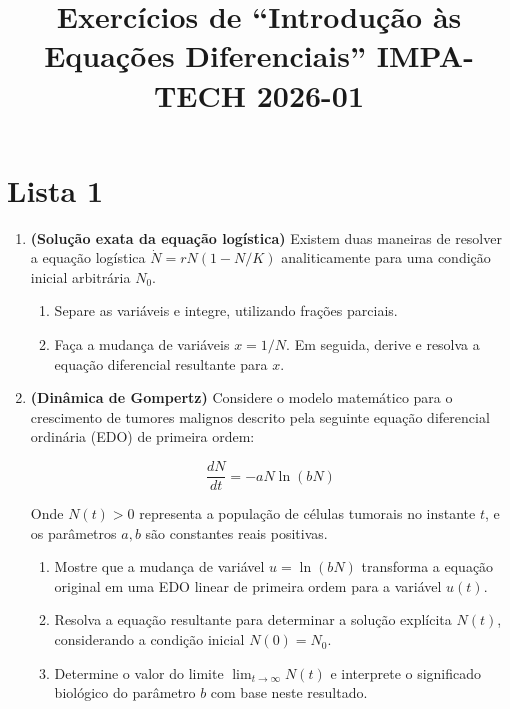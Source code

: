 \documentclass[a4paper,
11pt,  reqno]{amsart}
\title{Exercícios de ``Introdução às Equações Diferenciais''  IMPA-TECH 2026-01}
\begin{document}
\maketitle

\section*{Lista 1}
\begin{enumerate}
    \item \textbf{(Solução exata da equação logística)} Existem duas maneiras de resolver a equação logística $\dot{N} = rN(1 - N/K)$ analiticamente para uma condição inicial arbitrária $N_0$.
    
    \begin{enumerate}
        \item Separe as variáveis e integre, utilizando frações parciais.
        \item Faça a mudança de variáveis $x = 1/N$. Em seguida, derive e resolva a equação diferencial resultante para $x$.
    \end{enumerate}

    \medskip
    
    \item \textbf{(Dinâmica de Gompertz)} Considere o modelo matemático para o crescimento de tumores malignos descrito pela seguinte equação diferencial ordinária (EDO) de primeira ordem:
    
    \begin{equation*}
        \frac{dN}{dt} = -aN \ln(bN)
    \end{equation*}
    
    Onde $N(t) > 0$ representa a população de células tumorais no instante $t$, e os parâmetros $a, b$ são constantes reais positivas.
    
    \begin{enumerate}
        \item Mostre que a mudança de variável $u = \ln(bN)$ transforma a equação original em uma EDO linear de primeira ordem para a variável $u(t)$.
        \item Resolva a equação resultante para determinar a solução explícita $N(t)$, considerando a condição inicial $N(0) = N_0$.
        \item Determine o valor do limite $\displaystyle \lim_{t \to \infty} N(t)$ e interprete o significado biológico do parâmetro $b$ com base neste resultado.
    \end{enumerate}


\end{enumerate}
\end{document}
